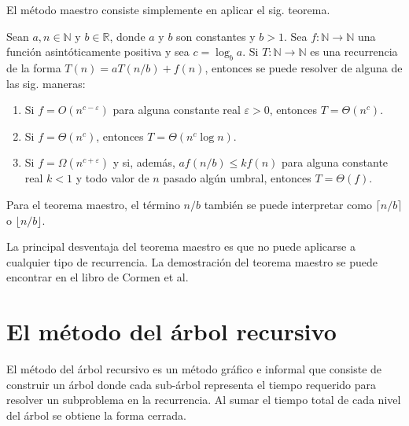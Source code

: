 El método maestro consiste simplemente en aplicar el sig. teorema.
\begin{thm}
Sean $a,n\in\mathbb{N}$ y $b\in\mathbb{R}$, donde $a$ y $b$ son
constantes y $b>1$. Sea $f:\mathbb{N}\to\mathbb{N}$ una función
asintóticamente positiva y sea $c=\log_{b}a$. Si $T:\mathbb{N}\to\mathbb{N}$
es una recurrencia de la forma $T(n)=aT(n/b)+f(n)$, entonces se puede
resolver de alguna de las sig. maneras:
\begin{enumerate}
\item Si $f=O(n^{c-\varepsilon})$ para alguna constante real $\varepsilon>0$,
entonces $T=\Theta(n^{c})$.
\item Si $f=\Theta(n^{c})$, entonces $T=\Theta(n^{c}\log n)$.
\item Si $f=\Omega(n^{c+\varepsilon})$ y si, además, $af(n/b)\leq kf(n)$
para alguna constante real $k<1$ y todo valor de $n$ pasado algún
umbral, entonces $T=\Theta(f)$.
\end{enumerate}
\end{thm}
\begin{rem}
Para el teorema maestro, el término $n/b$ también se puede interpretar
como $\lceil n/b\rceil$ o $\lfloor n/b\rfloor$.
\end{rem}
La principal desventaja del teorema maestro es que no puede aplicarse
a cualquier tipo de recurrencia. La demostración del teorema maestro
se puede encontrar en el libro de Cormen et al.

\section{El método del árbol recursivo}

El método del árbol recursivo es un método gráfico e informal que
consiste de construir un árbol donde cada sub-árbol representa el
tiempo requerido para resolver un subproblema en la recurrencia. Al
sumar el tiempo total de cada nivel del árbol se obtiene la forma
cerrada. 

